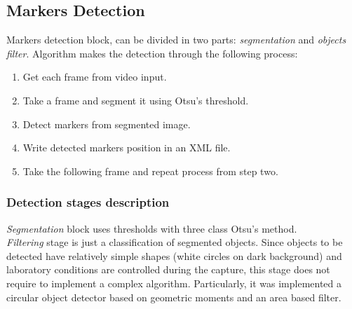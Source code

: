 \subsection{Markers Detection}
Markers detection block, can be divided in two parts: \textit{segmentation} and \textit{objects filter}.
%
Algorithm makes the detection through the following process:
%
\begin{enumerate}
  \item Get each frame from video input.
  \item Take a frame and segment it using Otsu's threshold.
  \item Detect markers from segmented image.
  \item Write detected markers position in an XML file.
  \item Take the following frame and repeat process from step two.
\end{enumerate}
%
\subsubsection{Detection stages description}
\textit{Segmentation} block uses thresholds with three class Otsu's method\cite{otsu}.\\
%
\textit{Filtering} stage is just a classification of segmented objects. Since objects to be detected have relatively simple shapes (white circles on dark background) and laboratory conditions are controlled during the capture, this stage does not require to implement a complex algorithm. Particularly, it was implemented a circular object detector based on geometric moments\cite{imageMoments} and an area based filter.
%
